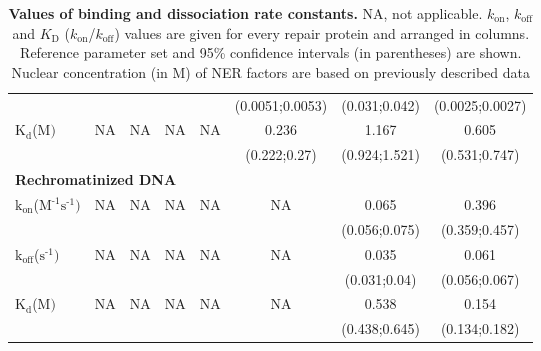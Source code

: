 \begin{table}[H]
\begin{tabular}{lccccccc}
		&                               &                              &                           &                          &(0.0051;0.0053)     &  (0.031;0.042)  & (0.0025;0.0027)  \\
		$\text{K}_{\text{d}}$({\textmu}$\text{M})$                                                  & NA                          &NA                         & NA                      &NA                      &0.236                   &1.167                    &0.605     \\
		&                               &                              &                           &                          &(0.222;0.27)     &  (0.924;1.521)  & (0.531;0.747)  \\
		\multicolumn{8}{l}{\textbf{Rechromatinized DNA}} \\
		$\text{k}_{\text{on}}$({\textmu}$\text{M}^{\text{-1}}\text{s}^{\text{-1}})$    & NA                          & NA                        & NA                      &  NA                    & NA                       &0.065                    &0.396    \\
		&                               &                             &                            &                          &                            &(0.056;0.075)    & (0.359;0.457)    \\
		$\text{k}_{\text{off}}$($\text{s}^{\text{-1}})$                                             & NA                          &NA                          & NA                      & NA                     & NA                       & 0.035                   &0.061     \\
		&                               &                              &                           &                          &                            &  (0.031;0.04)  & (0.056;0.067)  \\
		$\text{K}_{\text{d}}$({\textmu}$\text{M})$                                                  & NA                          &NA                         & NA                      &NA                      &NA                         &0.538                    &0.154     \\
		&                               &                              &                           &                          &                            &  (0.438;0.645)  & (0.134;0.182)  \\
		\hline
	\end{tabular}
	\caption{\textbf{Values of binding and dissociation rate constants.} NA, not applicable. $k_{\text{on}}$, $k_{\text{off}}$ and $K_{\text{D}}$ ($k_{\text{on}}$/$k_{\text{off}}$) values are given for every repair protein and arranged in columns. Reference parameter set and 95\% confidence intervals (in parentheses) are shown. Nuclear concentration (in \textmu M) of NER factors are based on previously described data \cite{Luijsterburg2010}}
	\label{tab:parameter_bigTable}
\end{table}

